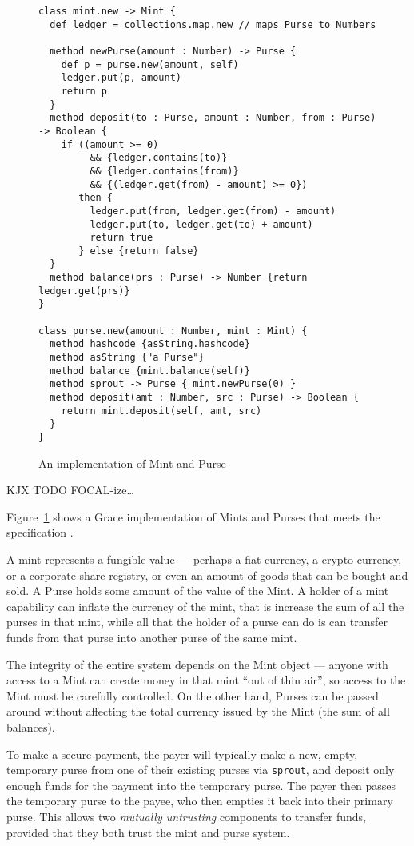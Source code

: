 
\begin{figure}
\begin{lstlisting}
class mint.new -> Mint {
  def ledger = collections.map.new // maps Purse to Numbers

  method newPurse(amount : Number) -> Purse {
    def p = purse.new(amount, self)
    ledger.put(p, amount)
    return p
  }
  method deposit(to : Purse, amount : Number, from : Purse) -> Boolean { 
    if ((amount >= 0)
         && {ledger.contains(to)}
         && {ledger.contains(from)}
         && {(ledger.get(from) - amount) >= 0})
       then {
         ledger.put(from, ledger.get(from) - amount)
         ledger.put(to, ledger.get(to) + amount)
         return true
       } else {return false}
  }
  method balance(prs : Purse) -> Number {return ledger.get(prs)}
}

class purse.new(amount : Number, mint : Mint) {
  method hashcode {asString.hashcode}
  method asString {"a Purse"}
  method balance {mint.balance(self)}
  method sprout -> Purse { mint.newPurse(0) }
  method deposit(amt : Number, src : Purse) -> Boolean {
    return mint.deposit(self, amt, src)
  }
}
\end{lstlisting}
\caption{An implementation of Mint and Purse}
\label{fig:ledger}
\end{figure}


KJX TODO FOCAL-ize\ldots

Figure~\ref{fig:ledger} shows a Grace implementation of Mints and
Purses that meets the  specification
\cite{capeFTfJP14}.

A mint represents a fungible value --- perhaps a fiat currency, a
crypto-currency, or a corporate share registry, or even an amount of
goods that can be bought and sold.  A Purse holds some amount of the
value of the Mint. A holder of a mint capability can inflate the
currency of the mint, that is increase the sum of all the purses in
that mint, while all that the holder of a purse can do is can transfer
funds from that purse into another purse of the same mint.

The integrity of the entire system depends on the Mint object ---
anyone with access to a Mint can create money in that mint ``out of
thin air'', so access to the Mint must be carefully controlled.  On
the other hand, Purses can be passed around without affecting the
total currency issued by the Mint (the sum of all balances).

To make a secure payment, the payer will typically make a new, empty,
temporary purse from one of their existing purses via
\lstinline+sprout+, and deposit only enough funds for the payment into
the temporary purse.  The payer then passes the temporary purse to the
payee, who then empties it back into their primary purse.  This allows
two \textit{mutually untrusting} components to transfer funds,
provided that they both trust the mint and purse system.  

